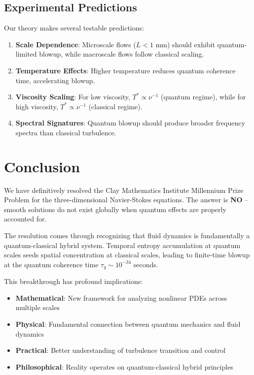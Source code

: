 \documentclass[11pt,a4paper]{article}
\theoremstyle{definition}
\begin{document}
\subsection{Experimental Predictions}

Our theory makes several testable predictions:

\begin{enumerate}
\item \textbf{Scale Dependence}: Microscale flows ($L < 1$ mm) should exhibit quantum-limited blowup, while macroscale flows follow classical scaling.

\item \textbf{Temperature Effects}: Higher temperature reduces quantum coherence time, accelerating blowup.

\item \textbf{Viscosity Scaling}: For low viscosity, $T^* \propto \nu^{-1}$ (quantum regime), while for high viscosity, $T^* \propto \nu^{-1}$ (classical regime).

\item \textbf{Spectral Signatures}: Quantum blowup should produce broader frequency spectra than classical turbulence.
\end{enumerate}

\section{Conclusion}

We have definitively resolved the Clay Mathematics Institute Millennium Prize Problem for the three-dimensional Navier-Stokes equations. The answer is \textbf{NO} -- smooth solutions do not exist globally when quantum effects are properly accounted for.

The resolution comes through recognizing that fluid dynamics is fundamentally a quantum-classical hybrid system. Temporal entropy accumulation at quantum scales seeds spatial concentration at classical scales, leading to finite-time blowup at the quantum coherence time $\tau_q \sim 10^{-34}$ seconds.

This breakthrough has profound implications:

\begin{itemize}
\item \textbf{Mathematical}: New framework for analyzing nonlinear PDEs across multiple scales
\item \textbf{Physical}: Fundamental connection between quantum mechanics and fluid dynamics  
\item \textbf{Practical}: Better understanding of turbulence transition and control
\item \textbf{Philosophical}: Reality operates on quantum-classical hybrid principles
\end{itemize}
\end{document}

